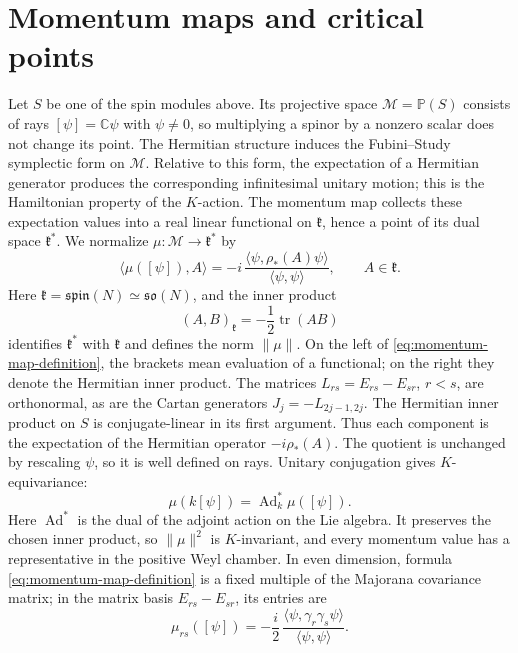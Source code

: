 \documentclass{article}
\theoremstyle{definition}
\theoremstyle{remark}
\newcommand{\C}{\mathbb C}
\newcommand{\PP}{\mathbb P}
\newcommand{\norm}[1]{\lVert #1\rVert}
\begin{document}
\section{Momentum maps and critical points}
\label{sec:momentum-map}

Let $S$ be one of the spin modules above. Its projective space
$\mathcal M=\PP(S)$ consists of rays $[\psi]=\C\psi$ with $\psi\ne0$,
so multiplying a spinor by a nonzero scalar does not change its point.
The Hermitian structure induces the Fubini--Study symplectic form on
$\mathcal M$. Relative to this form, the expectation of a Hermitian
generator produces the corresponding infinitesimal unitary motion;
this is the Hamiltonian property of the $K$-action. The momentum map
collects these expectation values into a real linear functional on
$\mathfrak k$, hence a point of its dual space $\mathfrak k^*$.
We normalize $\mu:\mathcal M\to\mathfrak k^*$ by
\begin{equation}
 \langle\mu([\psi]),A\rangle
 =-i\,\frac{\langle\psi,\rho_*(A)\psi\rangle}
              {\langle\psi,\psi\rangle},
 \qquad A\in\mathfrak k .
 \label{eq:momentum-map-definition}
\end{equation}
Here $\mathfrak k=\mathfrak{spin}(N)\simeq\mathfrak{so}(N)$, and the
inner product
\begin{equation*}
 (A,B)_{\mathfrak k}=-\frac12\operatorname{tr}(AB)
\end{equation*}
identifies $\mathfrak k^*$ with $\mathfrak k$ and defines the norm $\norm\mu$.
On the left of \eqref{eq:momentum-map-definition}, the brackets mean evaluation
of a functional; on the right they denote the Hermitian inner product.
The matrices
$L_{rs}=E_{rs}-E_{sr}$, $r<s$, are orthonormal, as are the Cartan
generators $J_j=-L_{2j-1,2j}$. The Hermitian inner product on $S$ is
conjugate-linear in its first argument.
Thus each component is the expectation of the Hermitian operator
$-i\rho_*(A)$. The quotient is unchanged by rescaling $\psi$, so it is
well defined on rays. Unitary conjugation gives $K$-equivariance:
\begin{equation}
 \mu(k[\psi])=\operatorname{Ad}^*_k\mu([\psi]).
 \label{eq:momentum-equivariance}
\end{equation}
Here $\operatorname{Ad}^*$ is the dual of the adjoint action on the Lie
algebra. It preserves the chosen inner product, so $\norm\mu^2$ is
$K$-invariant, and every momentum value has a representative in the
positive Weyl chamber.  In even dimension, formula \eqref{eq:momentum-map-definition} is a
fixed multiple of the Majorana covariance matrix; in the matrix basis
$E_{rs}-E_{sr}$, its entries are
\begin{equation}
 \mu_{rs}([\psi])
 =-\frac{i}{2}\,
   \frac{\langle\psi,\gamma_r\gamma_s\psi\rangle}
        {\langle\psi,\psi\rangle}.
 \label{eq:majorana-momentum}
\end{equation}
\end{document}
